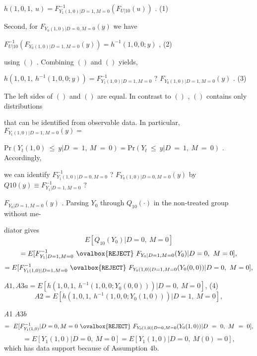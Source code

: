 \documentclass[a4paper,12pt]{article}
\begin{document}
\begin{center}
$h(1,0,1,\ u)=F_{Y_{1}(1,0)|D=1,M=0}^{-1}(F_{U|10}(u))$ .   (1)
\end{center}
Second, for $F_{Y_{0}(1,0)|D=0,M=0}(y)$ we have
\begin{center}
$F_{U|10}^{-1}(F_{Y_{0}(1,0)|D=1,M=0}(y))=h^{-1}(1,0,0;y)$ ,   (2)
\end{center}
using $()$ . Combining $()$ and $()$ yields,
\begin{center}
$h(1,0,1,\ h^{-1}(1,0,0;y))=F_{Y_{1}(1,0)|D=1,M=0}^{-1}$ ? $F_{Y_{0}(1,0)|D=1,M=0}(y)$ .   (3)
\end{center}
The left sides of $()$ and $()$ are equal. In contrast to $()$ , $()$ contains only distributions

that can be identified from observable data. In particular, $F_{Y_{\mathrm{t}}(1,0)|D=1,M=0}(y) =$

$\mathrm{P}\mathrm{r} (Y_{t}(1,0)\ \leq\ y|D\ =\ 1,\ M\ =\ 0) = \mathrm{P}\mathrm{r}(Y_{t}\ \leq\ y|D\ =\ 1,\ M\ =\ 0)$ . Accordingly,

we can identify $F_{Y_{1}(1,0)|D=0,M=0}^{-1}$ ? $F_{Y_{0}(1,0)|D=0,M=0}(y)$ by $Q10(y) \equiv F_{Y_{1}|D=1,M=0}^{-1}$ ?

$F_{Y_{0}|D=1,M=0}(y)$ . Parsing $Y_{0}$ through $Q_{10}(\cdot)$ in the non-treated group without me-

diator gives
$$
E[Q_{10}(Y_{0})|D=0,\ M=0]
$$
$$
=E[F_{Y_{1}|D=1,M=0}^{-1}\ \ovalbox{\tt\small REJECT}\ F_{Y_{0}|D=1,M=0}(Y_{0})|D=0,\ M=0],
$$
$$
=E[F_{Y_{1}(1,0)|D=1,M=0}^{-1}\ \ovalbox{\tt\small REJECT}\ F_{Y_{0}(1,0)|D=1,M=0}(Y_{0}(0,0))|D=0,\ M=0],
$$
\begin{center}
$A1,A3a=E[h(1,0,1,\ h^{-1}(1,0,0;Y_{0}(0,0)))|D=0,\ M=0]$,   (4)
$$
A2=E[h(1,0,1,\ h^{-1}(1,0,0;Y_{0}(1,0)))|D=1,\ M=0],
$$
\end{center}
{\it A}1 $A3b$
$$
=\ E[F_{Y_{1}(1,0)}^{-1}|D=0,M=0\ \ovalbox{\tt\small REJECT}\ F_{Y_{0}(1,0)|D=0,M=0}(Y_{0}(1,0))|D\ =\ 0,\ M\ =\ 0],
$$
$$
=E[Y_{1}(1,0)|D=0,\ M=0]=E[Y_{1}(1,0)|D=0,\ M(0)=0],
$$
which has data support because of Assumption $4\mathrm{b}.$
\end{document}
